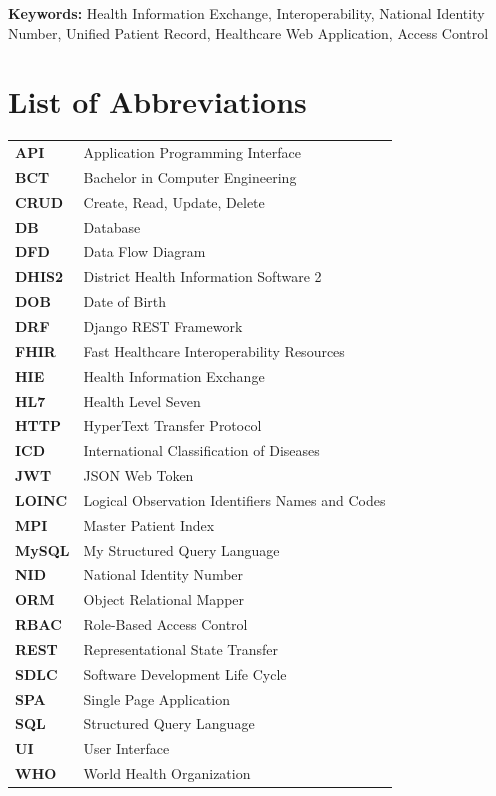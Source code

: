 \documentclass[12pt]{report}
\numberwithin{equation}{chapter}
\begin{document}
\vspace{0.5cm}
\noindent\textbf{Keywords:} Health Information Exchange, Interoperability, National Identity Number, Unified Patient Record, Healthcare Web Application, Access Control

\newpage
\tableofcontents
\newpage
\listoffigures
{}
\newpage
\listoftables
{}
\newpage

\chapter*{List of Abbreviations}
\begin{tabular}{@{}p{3.5cm}p{10.5cm}}
\textbf{API} & Application Programming Interface \\
\textbf{BCT} & Bachelor in Computer Engineering \\
\textbf{CRUD} & Create, Read, Update, Delete \\
\textbf{DB} & Database \\
\textbf{DFD} & Data Flow Diagram \\
\textbf{DHIS2} & District Health Information Software 2 \\
\textbf{DOB} & Date of Birth \\
\textbf{DRF} & Django REST Framework \\
\textbf{FHIR} & Fast Healthcare Interoperability Resources \\
\textbf{HIE} & Health Information Exchange \\
\textbf{HL7} & Health Level Seven \\
\textbf{HTTP} & HyperText Transfer Protocol \\
\textbf{ICD} & International Classification of Diseases \\
\textbf{JWT} & JSON Web Token \\
\textbf{LOINC} & Logical Observation Identifiers Names and Codes \\
\textbf{MPI} & Master Patient Index \\
\textbf{MySQL} & My Structured Query Language \\
\textbf{NID} & National Identity Number \\
\textbf{ORM} & Object Relational Mapper \\
\textbf{RBAC} & Role-Based Access Control \\
\textbf{REST} & Representational State Transfer \\
\textbf{SDLC} & Software Development Life Cycle \\
\textbf{SPA} & Single Page Application \\
\textbf{SQL} & Structured Query Language \\
\textbf{UI} & User Interface \\
\textbf{WHO} & World Health Organization \\
\end{tabular}
\end{document}
